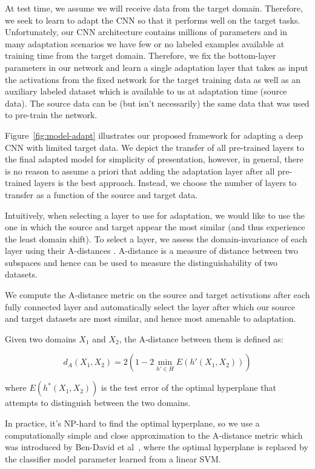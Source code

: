 At test time, we assume we will receive data from the target domain. Therefore, we seek to 
learn to adapt the CNN so that it performs well on the target tasks. Unfortunately,
our CNN architecture contains millions of parameters and in many adaptation 
scenarios we have few or no labeled examples available at training time from the
target domain. Therefore, we fix the bottom-layer parameters in our
network and learn a single adaptation layer that takes as input
the activations from the fixed network for the target training data as well as an auxiliary labeled
dataset which is available to us at adaptation time (source data). The source data
can be (but isn't necessarily) the same data that was used to pre-train the network.

Figure~\ref{fig:model-adapt} illustrates our proposed framework for adapting a deep CNN 
with limited target data. We depict the transfer of all pre-trained layers to the final adapted model 
for simplicity of presentation,  however, in general, there is no reason to assume a priori that 
adding the adaptation layer after all pre-trained layers is the best approach.  Instead, we choose
the number of layers to transfer as a function of the source and target data.

Intuitively, when selecting a layer to use for adaptation, we would like to use
the one in which the source and target appear the most similar (and thus
experience the least domain shift).
To select a layer, we assess the domain-invariance of each layer using their A-distances
\cite{adist}. A-distance is a measure of distance between two subspaces and hence 
can be used to measure the distinguishability of two datasets.

We compute the A-distance metric on the source and target activations after each fully 
connected layer 
and automatically select the  layer after which
our source and target datasets are most similar, and hence most amenable to adaptation.

Given two domains $X_1$ and $X_2$, the A-distance between them is defined as:

\begin{equation}
  d_A(X_1, X_2) = 2 \left( 1 - 2 \min_{h' \in H} E(h'(X_1, X_2))\right)
\end{equation}


where $E(h^*(X_1, X_2))$ is the test error of the optimal hyperplane that attempts to
distinguish between the two domains.

In practice, it's NP-hard to find the optimal hyperplane, so we use a computationally simple and 
close approximation to the A-distance metric which was introduced by Ben-David et al~\cite{adist-comp}, 
where the optimal hyperplane is replaced by the classifier model parameter learned from a linear SVM.

